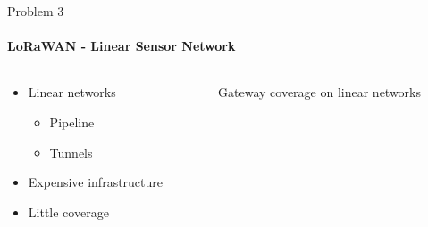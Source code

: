 \begin{frame}{Problem 3}
\framesubtitle{LoRaWAN - Linear Sensor Network}
\begin{columns}
\begin{column}{0.4\textwidth}
\begin{itemize}
    \item Linear networks
    \begin{itemize}
        \item Pipeline
        \item Tunnels
    \end{itemize}
    \item Expensive infrastructure
    \item Little coverage
\end{itemize}
\end{column}
\begin{column}{0.6\textwidth}
\begin{figure}[H]
    \centering
    \caption{Gateway coverage on linear networks\label{fig:lsn}}
\end{figure}
\end{column}
\end{columns}
\end{frame}


